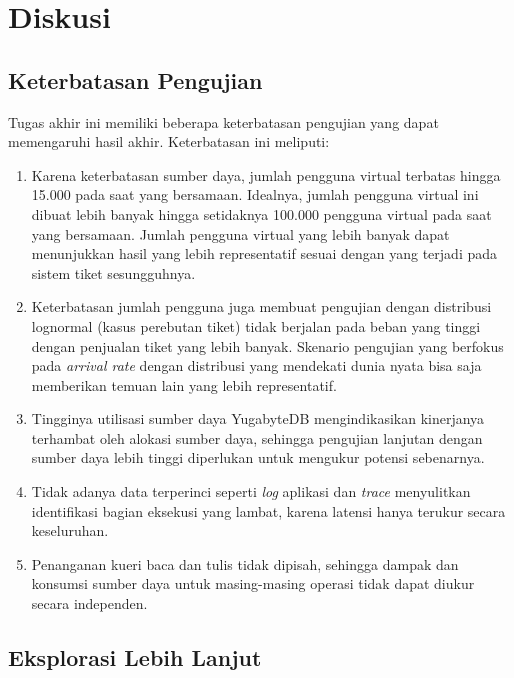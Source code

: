 \section{Diskusi}

\subsection{Keterbatasan Pengujian}
\label{keterbatasan-pengujian}

Tugas akhir ini memiliki beberapa keterbatasan pengujian yang dapat memengaruhi hasil akhir. Keterbatasan ini meliputi:

\begin{enumerate}
    \item Karena keterbatasan sumber daya, jumlah pengguna virtual terbatas hingga 15.000 pada saat yang bersamaan. Idealnya, jumlah pengguna virtual ini dibuat lebih banyak hingga setidaknya 100.000 pengguna virtual pada saat yang bersamaan. Jumlah pengguna virtual yang lebih banyak dapat menunjukkan hasil yang lebih representatif sesuai dengan yang terjadi pada sistem tiket sesungguhnya.
    \item Keterbatasan jumlah pengguna juga membuat pengujian dengan distribusi lognormal (kasus perebutan tiket) tidak berjalan pada beban yang tinggi dengan penjualan tiket yang lebih banyak. Skenario pengujian yang berfokus pada \textit{arrival rate} dengan distribusi yang mendekati dunia nyata bisa saja memberikan temuan lain yang lebih representatif.
    \item Tingginya utilisasi sumber daya YugabyteDB mengindikasikan kinerjanya terhambat oleh alokasi sumber daya, sehingga pengujian lanjutan dengan sumber daya lebih tinggi diperlukan untuk mengukur potensi sebenarnya.
    \item Tidak adanya data terperinci seperti \textit{log} aplikasi dan \textit{trace} menyulitkan identifikasi bagian eksekusi yang lambat, karena latensi hanya terukur secara keseluruhan.
    \item Penanganan kueri baca dan tulis tidak dipisah, sehingga dampak dan konsumsi sumber daya untuk masing-masing operasi tidak dapat diukur secara independen.
\end{enumerate}

\subsection{Eksplorasi Lebih Lanjut}
\label{pengembangan-lebih-lanjut}

